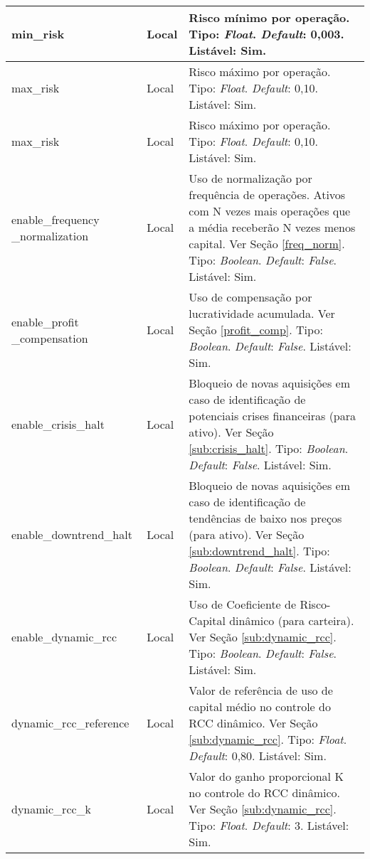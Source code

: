 \begin{center}
{\begin{longtable}[m]{| m{11em} | m{3em}| m{21em} |}
        \hline
        min\_risk & Local & Risco mínimo por operação. Tipo: \textit{Float}. \textit{Default}: 0,003. Listável: Sim. \\
        \hline
        max\_risk & Local & Risco máximo por operação. Tipo: \textit{Float}. \textit{Default}: 0,10. Listável: Sim. \\
        \hline
        max\_risk & Local & Risco máximo por operação. Tipo: \textit{Float}. \textit{Default}: 0,10. Listável: Sim. \\
        \hline
        enable\_frequency\hspace{2em} \_normalization & Local & Uso de normalização por frequência de operações. Ativos com N vezes mais operações que a média receberão N vezes menos capital. Ver Seção \ref{freq_norm}. Tipo: \textit{Boolean}. \textit{Default}: \textit{False}. Listável: Sim. \\
        \hline
        enable\_profit\hspace{4em} \_compensation & Local & Uso de compensação por lucratividade acumulada. Ver Seção \ref{profit_comp}. Tipo: \textit{Boolean}. \textit{Default}: \textit{False}. Listável: Sim. \\
        \hline
        enable\_crisis\_halt & Local & Bloqueio de novas aquisições em caso de identificação de potenciais crises financeiras (para ativo). Ver Seção \ref{sub:crisis_halt}. Tipo: \textit{Boolean}. \textit{Default}: \textit{False}. Listável: Sim. \\
        \hline
        enable\_downtrend\_halt & Local & Bloqueio de novas aquisições em caso de identificação de tendências de baixo nos preços (para ativo). Ver Seção \ref{sub:downtrend_halt}. Tipo: \textit{Boolean}. \textit{Default}: \textit{False}. Listável: Sim. \\
        \hline
        enable\_dynamic\_rcc & Local & Uso de Coeficiente de Risco-Capital dinâmico (para carteira). Ver Seção \ref{sub:dynamic_rcc}. Tipo: \textit{Boolean}. \textit{Default}: \textit{False}. Listável: Sim. \\
        \hline
        dynamic\_rcc\_reference & Local & Valor de referência de uso de capital médio no controle do RCC dinâmico. Ver Seção \ref{sub:dynamic_rcc}. Tipo: \textit{Float}. \textit{Default}: 0,80. Listável: Sim. \\
        \hline
        dynamic\_rcc\_k & Local & Valor do ganho proporcional K no controle do RCC dinâmico. Ver Seção \ref{sub:dynamic_rcc}. Tipo: \textit{Float}. \textit{Default}: 3. Listável: Sim. \\
        \hline


\end{longtable}}
\end{center}
